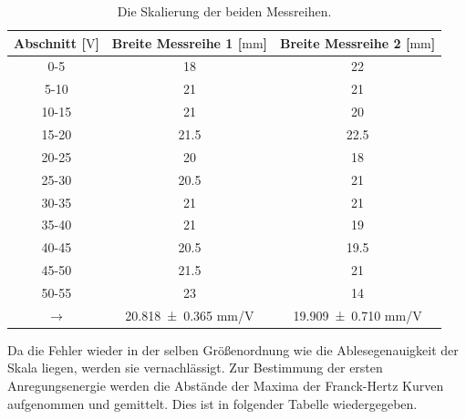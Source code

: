 \begin{table}[H]
  \centering
  \caption{Die Skalierung der beiden Messreihen.}
  \label{tab:skalierungauswfranckhertz}
    \begin{tabular}{S S S}
      \toprule
      {Abschnitt [$\si{\volt}$]} & {Breite Messreihe 1 [$\si{\milli\meter}$]} & {Breite Messreihe 2
      [$\si{\milli\meter}$]} \\
      \midrule
      {0-5}   &  18   & 22   \\
      {5-10}   &  21   & 21   \\
      {10-15}  &  21   & 20   \\
      {15-20}  &  21.5 & 22.5 \\
      {20-25}  &  20   & 18   \\
      {25-30}  &  20.5 & 21   \\
      {30-35}  &  21   & 21   \\
      {35-40}  &  21   & 19   \\
      {40-45}  &  20.5 & 19.5 \\
      {45-50}  &  21.5 & 21   \\
      {50-55}  &  23   & 14   \\
      {$\rightarrow$} & \num{20.818 \pm 0.365} mm/V  & \num{19.909 \pm 0.710} mm/V \\
      \bottomrule
    \end{tabular}
  \end{table}
\noindent
Da die Fehler wieder in der selben Größenordnung wie die Ablesegenauigkeit der Skala
liegen, werden sie vernachlässigt.
Zur Bestimmung der ersten Anregungsenergie werden die Abstände der Maxima der
Franck-Hertz Kurven aufgenommen und gemittelt. Dies ist in folgender Tabelle
wiedergegeben.

